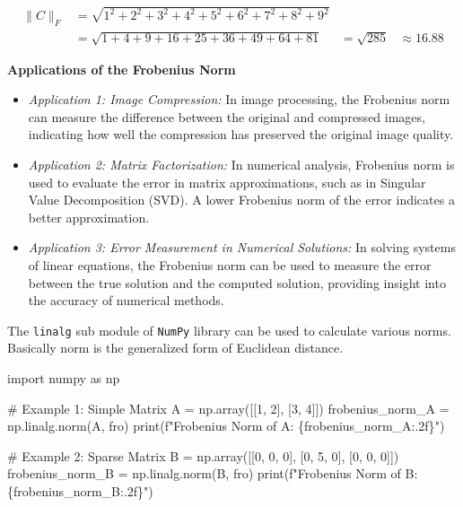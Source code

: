 \documentclass[
  letterpaper,
  DIV=11,
  numbers=noendperiod]{scrreprt}
\newenvironment{Shaded}{\begin{snugshade}}{\end{snugshade}}
\newcommand{\BuiltInTok}[1]{\textcolor[rgb]{0.00,0.23,0.31}{#1}}
\newcommand{\CommentTok}[1]{\textcolor[rgb]{0.37,0.37,0.37}{#1}}
\newcommand{\DecValTok}[1]{\textcolor[rgb]{0.68,0.00,0.00}{#1}}
\newcommand{\ImportTok}[1]{\textcolor[rgb]{0.00,0.46,0.62}{#1}}
\newcommand{\NormalTok}[1]{\textcolor[rgb]{0.00,0.23,0.31}{#1}}
\newcommand{\OperatorTok}[1]{\textcolor[rgb]{0.37,0.37,0.37}{#1}}
\newcommand{\SpecialCharTok}[1]{\textcolor[rgb]{0.37,0.37,0.37}{#1}}
\newcommand{\SpecialStringTok}[1]{\textcolor[rgb]{0.13,0.47,0.30}{#1}}
\newcommand{\StringTok}[1]{\textcolor[rgb]{0.13,0.47,0.30}{#1}}
\theoremstyle{plain}
\theoremstyle{definition}
\theoremstyle{remark}
\begin{document}
\begin{tcolorbox}
\begin{align*}
\|C\|_F &= \sqrt{1^2 + 2^2 + 3^2 + 4^2 + 5^2 + 6^2 + 7^2 + 8^2 + 9^2}\\
&= \sqrt{1 + 4 + 9 + 16 + 25 + 36 + 49 + 64 + 81}
&= \sqrt{285}
&\approx 16.88
\end{align*}

\textbf{Applications of the Frobenius Norm}

\begin{itemize}
\item
  \emph{Application 1: Image Compression:} In image processing, the
  Frobenius norm can measure the difference between the original and
  compressed images, indicating how well the compression has preserved
  the original image quality.
\item
  \emph{Application 2: Matrix Factorization:} In numerical analysis,
  Frobenius norm is used to evaluate the error in matrix approximations,
  such as in Singular Value Decomposition (SVD). A lower Frobenius norm
  of the error indicates a better approximation.
\item
  \emph{Application 3: Error Measurement in Numerical Solutions:} In
  solving systems of linear equations, the Frobenius norm can be used to
  measure the error between the true solution and the computed solution,
  providing insight into the accuracy of numerical methods.
\end{itemize}

The \texttt{linalg} sub module of \texttt{NumPy} library can be used to
calculate various norms. Basically norm is the generalized form of
Euclidean distance.

\begin{Shaded}
\begin{Highlighting}[]
\ImportTok{import}\NormalTok{ numpy }\ImportTok{as}\NormalTok{ np}

\CommentTok{\# Example 1: Simple Matrix}
\NormalTok{A }\OperatorTok{=}\NormalTok{ np.array([[}\DecValTok{1}\NormalTok{, }\DecValTok{2}\NormalTok{], [}\DecValTok{3}\NormalTok{, }\DecValTok{4}\NormalTok{]])}
\NormalTok{frobenius\_norm\_A }\OperatorTok{=}\NormalTok{ np.linalg.norm(A, }\StringTok{\textquotesingle{}fro\textquotesingle{}}\NormalTok{)}
\BuiltInTok{print}\NormalTok{(}\SpecialStringTok{f"Frobenius Norm of A: }\SpecialCharTok{\{}\NormalTok{frobenius\_norm\_A}\SpecialCharTok{:.2f\}}\SpecialStringTok{"}\NormalTok{)}

\CommentTok{\# Example 2: Sparse Matrix}
\NormalTok{B }\OperatorTok{=}\NormalTok{ np.array([[}\DecValTok{0}\NormalTok{, }\DecValTok{0}\NormalTok{, }\DecValTok{0}\NormalTok{], [}\DecValTok{0}\NormalTok{, }\DecValTok{5}\NormalTok{, }\DecValTok{0}\NormalTok{], [}\DecValTok{0}\NormalTok{, }\DecValTok{0}\NormalTok{, }\DecValTok{0}\NormalTok{]])}
\NormalTok{frobenius\_norm\_B }\OperatorTok{=}\NormalTok{ np.linalg.norm(B, }\StringTok{\textquotesingle{}fro\textquotesingle{}}\NormalTok{)}
\BuiltInTok{print}\NormalTok{(}\SpecialStringTok{f"Frobenius Norm of B: }\SpecialCharTok{\{}\NormalTok{frobenius\_norm\_B}\SpecialCharTok{:.2f\}}\SpecialStringTok{"}\NormalTok{)}


\end{Highlighting}
\end{Shaded}
\end{tcolorbox}
\end{document}
